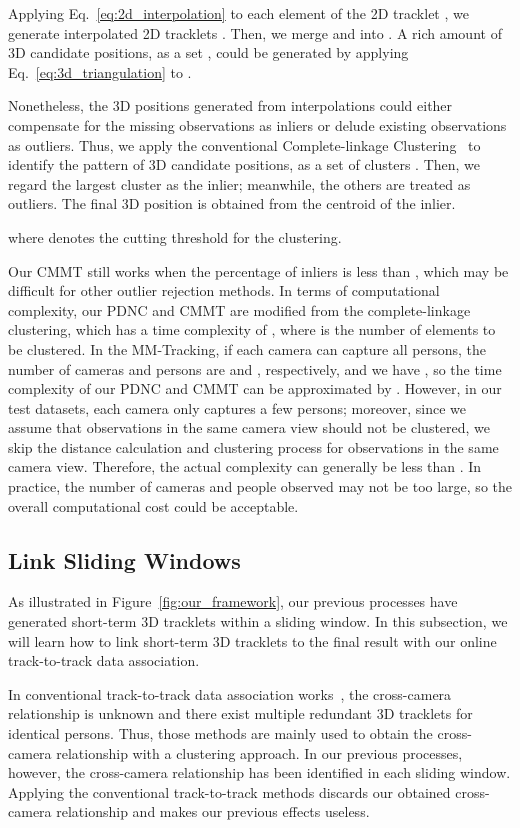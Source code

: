 \documentclass{CVM}
\begin{document}
Applying Eq.~\eqref{eq:2d_interpolation} to each element of the 2D tracklet , we generate interpolated 2D tracklets . Then, we merge  and  into . A rich amount of 3D candidate positions, as a set  , could be generated by applying Eq.~\eqref{eq:3d_triangulation} to . 

Nonetheless, the 3D positions generated from interpolations could either compensate for the missing observations as inliers or delude existing observations as outliers. Thus, we apply the conventional Complete-linkage Clustering~\cite{murtagh2012algorithms} to identify the pattern of 3D candidate positions, as a set of clusters . Then, we regard the largest cluster  as the inlier; meanwhile, the others are treated as outliers. The final 3D position is obtained from the centroid of the inlier. 


where   denotes the cutting threshold for the clustering. 


Our CMMT still works when the percentage of inliers is less than , which may be difficult for other outlier rejection methods. In terms of computational complexity, our PDNC and CMMT are modified from the complete-linkage clustering, which has a time complexity of , where  is the number of elements to be clustered.  In the MM-Tracking, if each camera can capture all persons, the number of cameras and persons are  and , respectively, and we have , so the time complexity of our PDNC and CMMT can be approximated by . However, in our test datasets, each camera only captures a few persons; moreover, since we assume that observations in the same camera view should not be clustered, we skip the distance calculation and clustering process for observations in the same camera view. Therefore, the actual complexity can generally be less than . In practice, the number of cameras and people observed may not be too large, so the overall computational cost could be acceptable.


\subsection{Link Sliding Windows}
\label{sec:link_sliding_windows}
As illustrated in Figure~\ref{fig:our_framework}, our previous processes have generated short-term 3D tracklets within a sliding window. In this subsection, we will learn how to link short-term 3D tracklets to the final result with our online track-to-track data association.


In conventional track-to-track data association works~\cite{chen2020multi,chen2020cross,ohashi20vmocap,dong2021fast}, the cross-camera relationship is unknown and there exist multiple redundant 3D tracklets for identical persons. Thus, those methods are mainly used to obtain the cross-camera relationship with a clustering approach. In our previous processes, however, the cross-camera relationship has been identified in each sliding window. Applying the conventional track-to-track methods discards our obtained cross-camera relationship and makes our previous effects useless.
\end{document}
